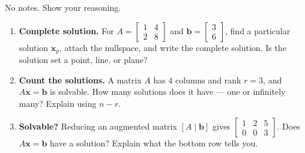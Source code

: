 \documentclass[10pt]{article}
\newcommand{\xx}{\mathbf{x}}
\newcommand{\bb}{\mathbf{b}}
\begin{document}
\namedateperiod

\vspace{0.15in}

No notes. Show your reasoning.

\begin{enumerate}[leftmargin=1.8em, itemsep=16pt]
  \item \textbf{Complete solution.} For $A=\begin{bmatrix} 1 & 4 \\ 2 & 8 \end{bmatrix}$ and
        $\bb=\begin{bmatrix} 3 \\ 6 \end{bmatrix}$, find a particular solution $\xx_p$, attach the
        nullspace, and write the complete solution. Is the solution set a point, line, or plane?
  \item \textbf{Count the solutions.} A matrix $A$ has $4$ columns and rank $r=3$, and $A\xx=\bb$ is
        solvable. How many solutions does it have --- one or infinitely many? Explain using $n-r$.
  \item \textbf{Solvable?} Reducing an augmented matrix $[A\mid\bb]$ gives
        $\left[\begin{array}{cc|c} 1 & 2 & 5 \\ 0 & 0 & 3 \end{array}\right]$. Does $A\xx=\bb$ have a
        solution? Explain what the bottom row tells you.
\end{enumerate}
\end{document}
